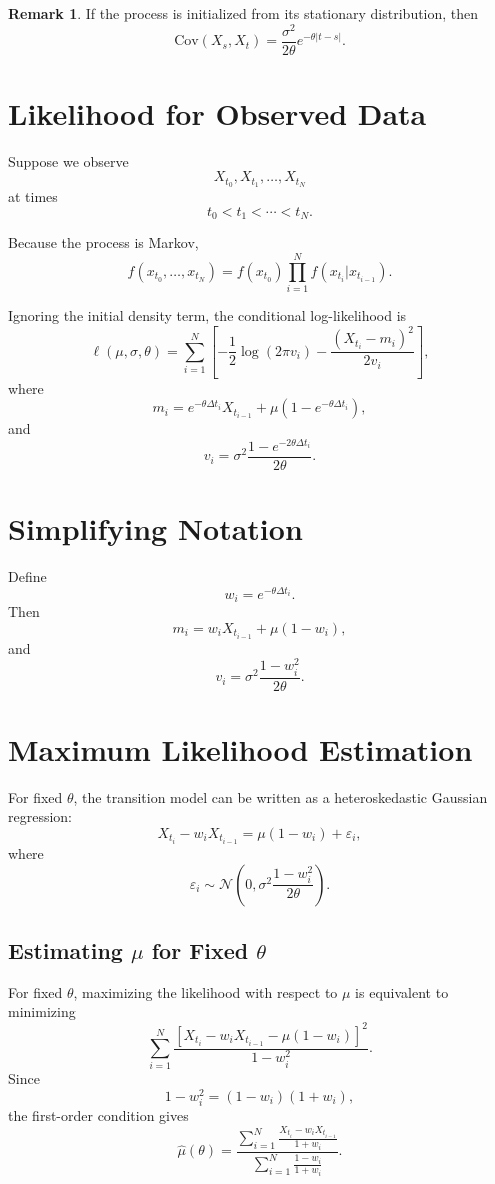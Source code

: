 \documentclass[12pt,oneside]{book}
\numberwithin{equation}{section}
\theoremstyle{definition}
\newtheorem{remark}{Remark}[section]
\theoremstyle{plain}
\theoremstyle{remark}
\newcommand{\Cov}{\mathrm{Cov}}
\newcommand{\Normal}{\mathcal{N}}
\begin{document}
\begin{remark}
If the process is initialized from its stationary distribution, then
\[
\Cov(X_s,X_t)
=
\frac{\sigma^2}{2\theta}e^{-\theta|t-s|}.
\]
\end{remark}

\section{Likelihood for Observed Data}

Suppose we observe
\[
X_{t_0},X_{t_1},\ldots,X_{t_N}
\]
at times
\[
t_0<t_1<\cdots<t_N.
\]

Because the process is Markov,
\[
f(x_{t_0},\ldots,x_{t_N})
=
f(x_{t_0})
\prod_{i=1}^N
f(x_{t_i}|x_{t_{i-1}}).
\]

Ignoring the initial density term, the conditional log-likelihood is
\[
\ell(\mu,\sigma,\theta)
=
\sum_{i=1}^N
\left[
-\frac{1}{2}\log(2\pi v_i)
-
\frac{(X_{t_i}-m_i)^2}{2v_i}
\right],
\]
where
\[
m_i
=
e^{-\theta\Delta t_i}X_{t_{i-1}}
+
\mu(1-e^{-\theta\Delta t_i}),
\]
and
\[
v_i
=
\sigma^2
\frac{1-e^{-2\theta\Delta t_i}}{2\theta}.
\]

\section{Simplifying Notation}

Define
\[
w_i=e^{-\theta\Delta t_i}.
\]
Then
\[
m_i=w_iX_{t_{i-1}}+\mu(1-w_i),
\]
and
\[
v_i
=
\sigma^2\frac{1-w_i^2}{2\theta}.
\]

\section{Maximum Likelihood Estimation}

For fixed $\theta$, the transition model can be written as a heteroskedastic Gaussian regression:
\[
X_{t_i}-w_iX_{t_{i-1}}
=
\mu(1-w_i)+\varepsilon_i,
\]
where
\[
\varepsilon_i\sim
\Normal\left(
0,
\sigma^2\frac{1-w_i^2}{2\theta}
\right).
\]

\subsection{Estimating $\mu$ for Fixed $\theta$}

For fixed $\theta$, maximizing the likelihood with respect to $\mu$ is equivalent to minimizing
\[
\sum_{i=1}^N
\frac{
\left[X_{t_i}-w_iX_{t_{i-1}}-\mu(1-w_i)\right]^2
}{
1-w_i^2
}.
\]
Since
\[
1-w_i^2=(1-w_i)(1+w_i),
\]
the first-order condition gives
\[
\hat{\mu}(\theta)
=
\frac{
\sum_{i=1}^N
\frac{X_{t_i}-w_iX_{t_{i-1}}}{1+w_i}
}{
\sum_{i=1}^N
\frac{1-w_i}{1+w_i}
}.
\]
\end{document}
